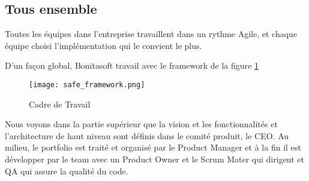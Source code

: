 \subsection{Tous ensemble}

Toutes les équipes dans l'entreprise travaillent dans un rythme Agile, et chaque équipe choisi l'implémentation qui le convient le plus.

D'un façon global, Bonitasoft travail avec le framework de la figure \ref{frame_safe}

\begin{figure}[!ht]
\centering
\texttt{[image: safe\_framework.png]}
\caption{Cadre de Travail \cite{safe}}
\label{frame_safe}
\end{figure}

Nous voyons dans la partie supérieur que la vision et les fonctionnalités et l'architecture de haut niveau sont définis dans le comité produit, le CEO.
Au milieu, le portfolio est traité et organisé par le Product Manager et à la fin il est développer par le team avec un Product Owner et le Scrum Mater qui dirigent et QA qui assure la qualité du code.
